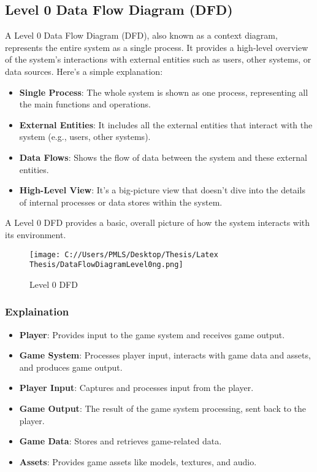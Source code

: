 \subsection{Level 0 Data Flow Diagram (DFD)}
A Level 0 Data Flow Diagram (DFD), also known as a context diagram, represents the entire system as a single process. It provides a high-level overview of the system's interactions with external entities such as users, other systems, or data sources. Here’s a simple explanation:

\begin{itemize}
	\item \textbf{Single Process}: The whole system is shown as one process, representing all the main functions and operations.
	\item \textbf{External Entities}: It includes all the external entities that interact with the system (e.g., users, other systems).
	\item \textbf{Data Flows}: Shows the flow of data between the system and these external entities.
	\item \textbf{High-Level View}: It’s a big-picture view that doesn't dive into the details of internal processes or data stores within the system.
\end{itemize}

A Level 0 DFD provides a basic, overall picture of how the system interacts with its environment.
\begin{figure}[H]
	\centering
	\texttt{[image: C://Users/PMLS/Desktop/Thesis/Latex Thesis/DataFlowDiagramLevel0ng.png]}
	\caption{Level 0 DFD}
	\label{fig:Level 0 Data Flow Diagram}
\end{figure}


\subsubsection{Explaination}

\begin{itemize}
	\item \textbf{Player}: Provides input to the game system and receives game output.
	\item \textbf{Game System}: Processes player input, interacts with game data and assets, and produces game output.
	\item \textbf{Player Input}: Captures and processes input from the player.
	\item \textbf{Game Output}: The result of the game system processing, sent back to the player.
	\item \textbf{Game Data}: Stores and retrieves game-related data.
	\item \textbf{Assets}: Provides game assets like models, textures, and audio.
\end{itemize}

